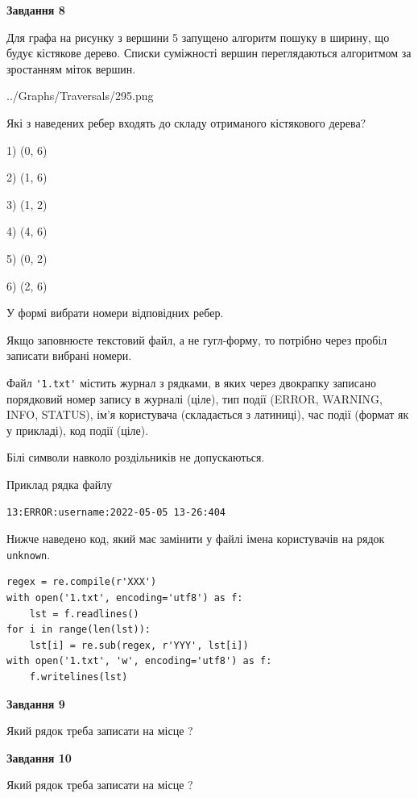 \documentclass[12pt, ukrainian]{article}
\def\code#1{\Verb!#1!}
\begin{document}
{\begin {large}
{\begin {center}\textbf{Завдання 8}\end {center}}\par
Для графа на рисунку з вершини 5 запущено алгоритм пошуку в ширину, що будує кістякове дерево. Списки суміжності вершин переглядаються алгоритмом за зростанням міток вершин.\par
\begin{center}
	{../Graphs/Traversals/295.png}
\end{center}
\par Які з наведених ребер входять до складу отриманого кістякового дерева?\par
1) (0, 6)\par
2) (1, 6)\par
3) (1, 2)\par
4) (4, 6)\par
5) (0, 2)\par
6) (2, 6)\par
{\vskip 15pt} У формі вибрати номери відповідних ребер.


Якщо заповнюєте текстовий файл, а не гугл-форму, то потрібно через пробіл записа\-ти вибрані номери.\par
\newpage


Файл \code{'1.txt'} містить журнал з рядками, в яких через двокрапку записано поряд\-ко\-вий номер запису в журналі (ціле), тип події (ERROR, WARNING, INFO, STATUS), ім'я користувача (складається з латиниці), час події (фор\-мат як у прикладі), код події (ціле).

Білі символи навколо роздільників не допускаються.

Приклад рядка файлу



\begin{verbatim}
13:ERROR:username:2022-05-05 13-26:404
\end{verbatim}


Нижче наведено код, який має замінити у файлі імена користувачів на рядок \code{unknown}.



\begin{verbatim}
regex = re.compile(r'XXX')
with open('1.txt', encoding='utf8') as f:
    lst = f.readlines()
for i in range(len(lst)):
    lst[i] = re.sub(regex, r'YYY', lst[i])
with open('1.txt', 'w', encoding='utf8') as f:
    f.writelines(lst)
\end{verbatim}




{\begin {center}\textbf{Завдання 9}\end {center}}\par
Який рядок треба записати на місце  ?\par
\vspace{5mm}


{\begin {center}\textbf{Завдання 10}\end {center}}\par
Який рядок треба записати на місце  ?\par


\newpage


\end {large}}
\end{document}
